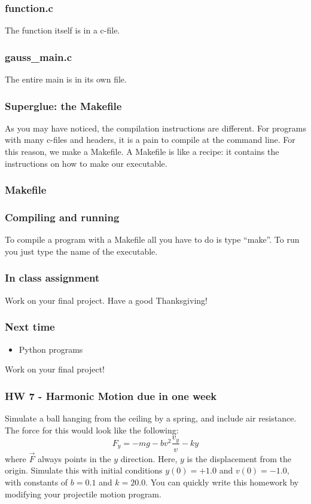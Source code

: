 \documentclass{beamer}
\begin{document}
\begin{frame}[fragile]
  \frametitle{function.c}
  The function itself is in a c-file.
  
\end{frame}

\begin{frame}[fragile]
  \frametitle{gauss\_main.c}
  The entire main is in its own file.
  
\end{frame}

\begin{frame}
  \frametitle{Superglue: the Makefile}
  As you may have noticed, the compilation instructions are different.
  For programs with many c-files and headers, it is a pain to compile
  at the command line. For this reason, we make a Makefile. A Makefile
  is like a recipe: it contains the instructions on how to make
  our executable.
\end{frame}

\begin{frame}
  \frametitle{Makefile}
  
\end{frame}

\begin{frame}
  \frametitle{Compiling and running}
  To compile a program with a Makefile all you have to do is type ``make''.
  To run you just type the name of the executable.
\end{frame}

\begin{frame}
  \frametitle{In class assignment}
  Work on your final project. Have a good Thanksgiving!
\end{frame}

\begin{frame}
  \frametitle{Next time}
  \begin{itemize}
  \item Python programs
  \end{itemize}
  Work on your final project!
\end{frame}

\begin{frame}
  \frametitle{HW 7 - Harmonic Motion due in one week}
  Simulate a ball hanging from the ceiling by a spring, 
  and include air resistance.
  The force for this would look like the following:
  \begin{equation*}
    F_y = -mg - bv^2\frac{v_y}{v} - ky
  \end{equation*}
  where $\vec{F}$ always points in the $y$ direction. Here,
  $y$ is the displacement from the origin.
  Simulate this with initial conditions $y(0)=+1.0$ and $v(0)=-1.0$, 
  with constants of $b=0.1$ and $k = 20.0$.
  You can quickly write this homework by modifying your projectile motion
  program.
\end{frame}
\end{document}
